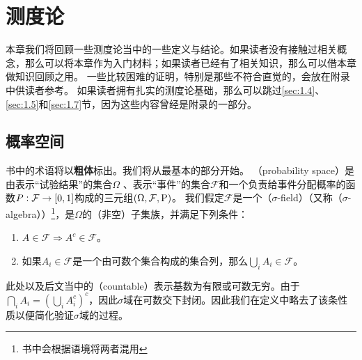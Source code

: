 \documentclass[main.tex]{subfiles}
\begin{document}
\chapter{测度论}
本章我们将回顾一些测度论当中的一些定义与结论。如果读者没有接触过相关概念，那么可以将本章作为入门材料；如果读者已经有了相关知识，那么可以借本章做知识回顾之用。
一些比较困难的证明，特别是那些不符合直觉的，会放在附录中供读者参考。
如果读者拥有扎实的测度论基础，那么可以跳过\ref{sec:1.4}、\ref{sec:1.5}和\ref{sec:1.7}节，因为这些内容曾经是附录的一部分。

\section{概率空间} \label{sec:1.1}
书中的术语将以\textbf{粗体}标出。我们将从最基本的部分开始。
（probability space）是由表示``试验结果''的集合\(\Omega\) 、表示``事件''的集合\(\mathcal{F}\)和一个负责给事件分配概率的函数\(P:\mathcal{F} \rightarrow \intcc{0, 1}\)构成的三元组\((\Omega, \mathcal{F}, \operatorname{\mathrm{P}})\)。
我们假定\(\mathcal{F}\)是一个（\(\sigma\)-field）（又称（\(\sigma\)-algebra））\footnote{书中会根据语境将两者混用}，是\(\Omega\)的（非空）子集族，并满足下列条件：
\begin{enumerate}
	\item \(A \in \mathcal{F} \Rightarrow A^c \in \mathcal{F}\)。
	\item \label{def:measure:2} 如果\(A_i \in \mathcal{F}\)是一个由可数个集合构成的集合列，那么\(\bigcup_i A_i \in \mathcal{F}\)。
\end{enumerate}

此处以及后文当中的（countable）表示基数为有限或可数无穷。由于\(\bigcap_i A_i = (\bigcup_i A_i^c)^c\)，因此\(\sigma\)域在可数交下封闭。因此我们在定义中略去了该条性质以便简化验证\(\sigma\)域的过程。
\end{document}
